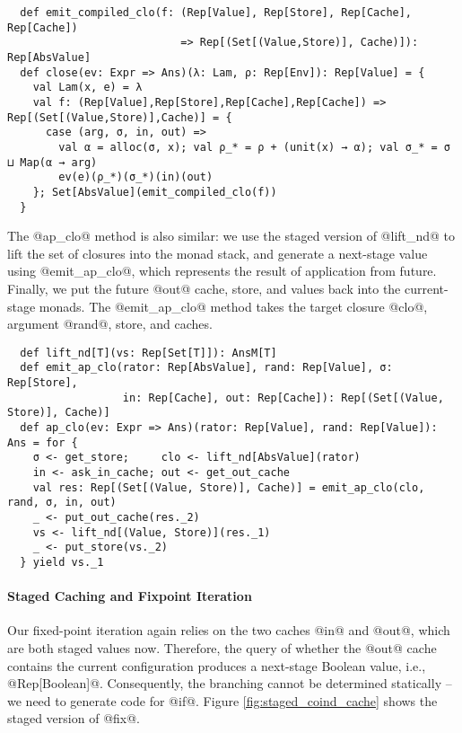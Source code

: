 \begin{lstlisting}
  def emit_compiled_clo(f: (Rep[Value], Rep[Store], Rep[Cache], Rep[Cache])
                           => Rep[(Set[(Value,Store)], Cache)]): Rep[AbsValue]
  def close(ev: Expr => Ans)(λ: Lam, ρ: Rep[Env]): Rep[Value] = {
    val Lam(x, e) = λ
    val f: (Rep[Value],Rep[Store],Rep[Cache],Rep[Cache]) => Rep[(Set[(Value,Store)],Cache)] = {
      case (arg, σ, in, out) =>
        val α = alloc(σ, x); val ρ_* = ρ + (unit(x) → α); val σ_* = σ ⊔ Map(α → arg)
        ev(e)(ρ_*)(σ_*)(in)(out)
    }; Set[AbsValue](emit_compiled_clo(f))
  }
\end{lstlisting}

The @ap_clo@ method is also similar: we use the staged version of @lift_nd@ to
lift the set of closures into the monad stack, and generate a next-stage value
using @emit_ap_clo@, which represents the result of application from future.
Finally, we put the future @out@ cache, store, and values back into the
current-stage monads. The @emit_ap_clo@ method takes the target closure @clo@,
argument @rand@, store, and caches.

\begin{lstlisting}
  def lift_nd[T](vs: Rep[Set[T]]): AnsM[T]
  def emit_ap_clo(rator: Rep[AbsValue], rand: Rep[Value], σ: Rep[Store],
                  in: Rep[Cache], out: Rep[Cache]): Rep[(Set[(Value, Store)], Cache)]
  def ap_clo(ev: Expr => Ans)(rator: Rep[Value], rand: Rep[Value]): Ans = for {
    σ <- get_store;     clo <- lift_nd[AbsValue](rator)
    in <- ask_in_cache; out <- get_out_cache
    val res: Rep[(Set[(Value, Store)], Cache)] = emit_ap_clo(clo, rand, σ, in, out)
    _ <- put_out_cache(res._2)
    vs <- lift_nd[(Value, Store)](res._1)
    _ <- put_store(vs._2)
  } yield vs._1
\end{lstlisting}

\paragraph{Staged Caching and Fixpoint Iteration} 

Our fixed-point iteration again relies on the two caches @in@ and @out@, which are
both staged values now. Therefore, the query of whether the @out@ cache contains
the current configuration produces a next-stage Boolean value, i.e.,
@Rep[Boolean]@. Consequently, the branching cannot be determined statically --
we need to generate code for @if@. Figure \ref{fig:staged_coind_cache} shows the
staged version of @fix@.

